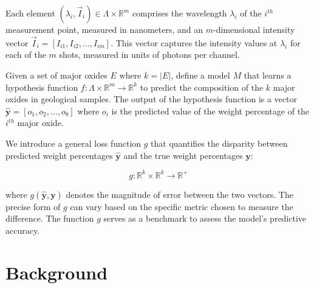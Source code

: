 Each element $(\lambda_i, \vec{I}_i) \in \Lambda \times \mathbb{R}^{m}$ comprises the wavelength $\lambda_i$ of the $i^{th}$ measurement point, measured in nanometers, and an $m$-dimensional intensity vector $\vec{I}_i = [I_{i1}, I_{i2}, \ldots, I_{im}]$.
This vector captures the intensity values at $\lambda_i$ for each of the $m$ shots, measured in units of photons per channel.

Given a set of major oxides $E$ where $k=|E|$, define a model $M$ that learns a hypothesis function $f: \Lambda \times \mathbb{R}^m \rightarrow \mathbb{R}^k$ to predict the composition of the $k$ major oxides in geological samples.
The output of the hypothesis function is a vector $\mathbf{\hat{y}} = [o_{1}, o_{2}, \ldots, o_{8}]$ where $o_{i}$ is the predicted value of the weight percentage of the $i^{th}$ major oxide.

We introduce a general loss function $g$ that quantifies the disparity between predicted weight percentages $\mathbf{\hat{y}}$ and the true weight percentages $\mathbf{y}$:

\begin{equation}
g: \mathbb{R}^k \times \mathbb{R}^k \rightarrow \mathbb{R}^+
\end{equation}

where $g(\mathbf{\hat{y}}, \mathbf{y})$ denotes the magnitude of error between the two vectors.
The precise form of $g$ can vary based on the specific metric chosen to measure the difference. The function $g$ serves as a benchmark to assess the model's predictive accuracy.



% 
% 


\section{Background}

